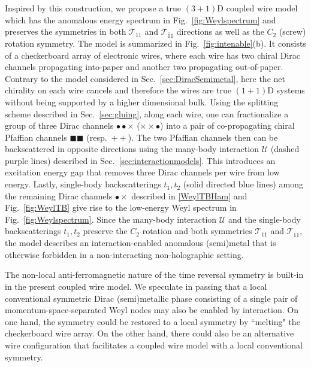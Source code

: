 Inspired by this construction, we propose a true $(3+1)$D coupled wire model which has the anomalous energy spectrum in Fig.~\ref{fig:Weylspectrum} and preserves the \AFTR symmetries in both $\mathcal{T}_{11}$ and $\mathcal{T}_{\bar{1}1}$ directions as well as the $C_2$ (screw) rotation symmetry. The model is summarized in Fig.~\ref{fig:intenable}(b). It consists of a checkerboard array of electronic wires, where each wire has two chiral Dirac channels propagating into-paper and another two propagating out-of-paper. Contrary to the model considered in Sec.~\ref{sec:DiracSemimetal}, here the net chirality on each wire cancels and therefore the wires are true $(1+1)$D systems without being supported by a higher dimensional bulk. Using the splitting scheme described in Sec.~\ref{sec:gluing}, along each wire, one can fractionalize a group of three Dirac channels {\color{red}$\bullet\bullet\times$} ({\color{red}$\times\times\bullet$}) into a pair of co-propagating chiral Pfaffian channels {\color{green}$\blacksquare\blacksquare$} (resp.~{\color{green}$++$}). The two Pfaffian channels then can be backscattered in opposite directions using the many-body interaction $\mathcal{U}$ (dashed purple lines) described in Sec.~\ref{sec:interactionmodels}. This introduces an excitation energy gap that removes three Dirac channels per wire from low energy. Lastly, single-body backscatterings $t_1,t_2$ (solid directed blue lines) among the remaining Dirac channels {\color{blue}$\bullet\times$} described in \eqref{WeylTBHam} and Fig.~\ref{fig:WeylTB} give rise to the low-energy Weyl spectrum in Fig.~\ref{fig:Weylspectrum}. Since the many-body interaction $\mathcal{U}$ and the single-body backscatterings $t_1,t_2$ preserve the $C_2$ rotation and both \AFTR symmetries $\mathcal{T}_{11}$ and $\mathcal{T}_{\bar{1}1}$, the model describes an interaction-enabled anomalous (semi)metal that is otherwise forbidden in a non-interacting non-holographic setting. 

The non-local anti-ferromagnetic nature of the time reversal symmetry is built-in in the present coupled wire model. We speculate in passing that a local conventional \TR symmetric Dirac (semi)metallic phase consisting of a single pair of momentum-space-separated Weyl nodes may also be enabled by interaction. On one hand, the \AFTR symmetry could be restored to a local \TR symmetry by ``melting" the checkerboard wire array. On the other hand, there could also be an alternative wire configuration that facilitates a coupled wire model with a local conventional \TR symmetry.

